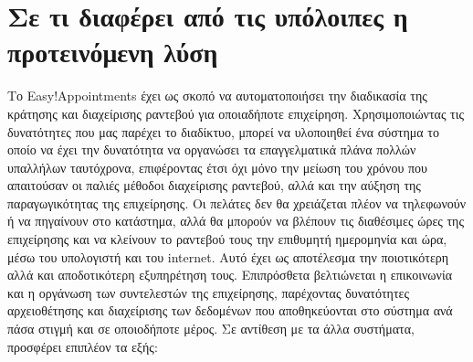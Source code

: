 \section{Σε τι διαφέρει από τις υπόλοιπες η προτεινόμενη λύση}
Το Easy!Appointments έχει ως σκοπό να αυτοματοποιήσει την διαδικασία της κράτησης και διαχείρισης ραντεβού για οποιαδήποτε επιχείρηση. Χρησιμοποιώντας τις δυνατότητες που μας παρέχει το διαδίκτυο, μπορεί να υλοποιηθεί ένα σύστημα το οποίο να έχει την δυνατότητα να οργανώσει τα επαγγελματικά πλάνα πολλών υπαλλήλων ταυτόχρονα, επιφέροντας έτσι όχι μόνο την μείωση του χρόνου που απαιτούσαν οι παλιές μέθοδοι διαχείρισης ραντεβού, αλλά και την αύξηση της παραγωγικότητας της επιχείρησης. Οι πελάτες δεν θα χρειάζεται πλέον να τηλεφωνούν ή να πηγαίνουν στο κατάστημα, αλλά θα μπορούν να βλέπουν τις διαθέσιμες ώρες της επιχείρησης και να κλείνουν το ραντεβού τους την επιθυμητή ημερομηνία και ώρα, μέσω του υπολογιστή και του internet. Αυτό έχει ως αποτέλεσμα την ποιοτικότερη αλλά και αποδοτικότερη εξυπηρέτηση τους. Επιπρόσθετα βελτιώνεται η επικοινωνία και η οργάνωση των συντελεστών της επιχείρησης, παρέχοντας δυνατότητες αρχειοθέτησης και διαχείρισης των δεδομένων που αποθηκεύονται στο σύστημα ανά πάσα στιγμή και σε οποιοδήποτε μέρος. Σε αντίθεση με τα άλλα συστήματα, προσφέρει επιπλέον τα εξής:

